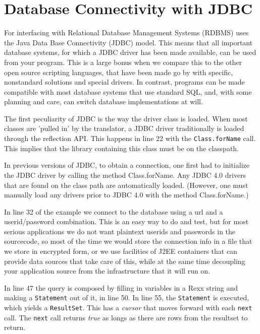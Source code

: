 {\chapter{Database Connectivity with JDBC}
For interfacing with Relational Database Management Systems (RDBMS)
\nr{} uses the Java Data Base Connectivity (JDBC) model. This means
that all important database systems, for which a JDBC driver has
been made available, can be used from your \nr{} program. This is a
large bonus when we compare this to the other open source scripting
languages, that have been made go by with specific, nonstandard
solutions and special drivers. In contrast, \nr{} programs can be
made compatible with most database systems that use standard SQL, and,
with some planning and care, can switch database implementations at
will.
 

The first peculiarity of JDBC is the way the driver class is
loaded. When most classes are 'pulled in' by the translator, a JDBC
driver traditionally is loaded through the reflection API. This
happens in line 22 with the \texttt{Class.forName} call. This implies
that the library containing this class must be on the classpath.

\begin{shaded}\noindent
In previous versions of JDBC, to obtain a connection, one first had to
initialize the JDBC driver by calling the method Class.forName. Any
JDBC 4.0 drivers that are found on the class path are automatically
loaded. (However, one must manually load any drivers prior to JDBC 4.0
with the method Class.forName.)
\end{shaded}\indent

In line 32 of the example we connect to the database using a url and a
userid/password combination. This is an easy way to do and test, but
for most serious applications we do not want plaintext userids and
passwords in the sourcecode, so most of the time we would store the
connection info in a file that we store in encrypted form, or we use
facilities of J2EE containers that can provide data sources that take
care of this, while at the same time decoupling your application
source from the infrastructure that it will run on.

In line 47 the query is composed by filling in variables in a Rexx
string and making a \texttt{Statement} out of it, in line 50. In line
  55, the \texttt{Statement} is executed, which yields a
  \texttt{ResultSet}. This has a \emph{cursor} that moves forward with
  each \texttt{next} call. The \texttt{next} call returns \emph{true}
  as longs as there are rows from the resultset to return.

}
